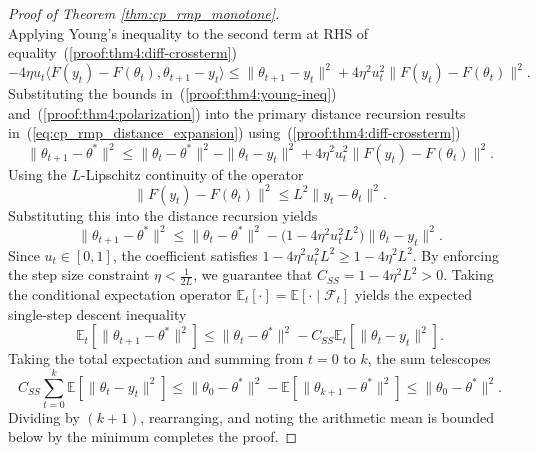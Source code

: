 \documentclass[letter,11pt]{article}
\begin{document}
\begin{proof}[Proof of Theorem \ref{thm:cp_rmp_monotone}]
\begin{equation}
\end{equation}
Applying Young's inequality to the second term at RHS of equality~(\ref{proof:thm4:diff-crossterm})
\begin{equation}\label{proof:thm4:young-ineq}
-4\eta u_t \langle F(y_t) - F(\theta_t), \theta_{t+1} - y_t \rangle \le \|\theta_{t+1} - y_t\|^2 + 4\eta^2 u_t^2 \|F(y_t) - F(\theta_t)\|^2.
\end{equation}
Substituting the bounds in~(\ref{proof:thm4:young-ineq}) and~(\ref{proof:thm4:polarization}) into the primary distance recursion results in~(\ref{eq:cp_rmp_distance_expansion}) using~(\ref{proof:thm4:diff-crossterm})
\begin{equation}
\|\theta_{t+1} - \theta^*\|^2 \le \|\theta_t - \theta^*\|^2 - \|\theta_t - y_t\|^2 + 4\eta^2 u_t^2 \|F(y_t) - F(\theta_t)\|^2.
\end{equation}
Using the $L$-Lipschitz continuity of the operator
\begin{equation}
\|F(y_t) - F(\theta_t)\|^2 \le L^2 \|y_t - \theta_t\|^2.
\end{equation}
Substituting this into the distance recursion yields
\begin{equation}\label{proof:thm4:distance-recursion}
\|\theta_{t+1} - \theta^*\|^2 \le \|\theta_t - \theta^*\|^2 - \big( 1 - 4\eta^2 u_t^2 L^2 \big) \|\theta_t - y_t\|^2.
\end{equation}
Since $u_t \in [0, 1]$, the coefficient satisfies $1 - 4\eta^2 u_t^2 L^2 \ge 1 - 4\eta^2 L^2$. By enforcing the step size constraint $\eta < \frac{1}{2L}$, we guarantee that $C_{SS} = 1 - 4\eta^2 L^2 > 0$. Taking the conditional expectation operator $\mathbb{E}_t[\cdot] = \mathbb{E}[\cdot \mid \mathcal{F}_t]$ yields the expected single-step descent inequality
\begin{equation}\label{proof:thm4:single-step-descent}
\mathbb{E}_t\left[\|\theta_{t+1} - \theta^*\|^2\right] \le \|\theta_t - \theta^*\|^2 - C_{SS} \mathbb{E}_t\left[\|\theta_t - y_t\|^2\right].
\end{equation}
Taking the total expectation and summing from $t = 0$ to $k$, the sum telescopes
\begin{equation}
C_{SS} \sum_{t=0}^k \mathbb{E}\left[\|\theta_t - y_t\|^2\right] \le \|\theta_0 - \theta^*\|^2 - \mathbb{E}\left[\|\theta_{k+1} - \theta^*\|^2\right] \le \|\theta_0 - \theta^*\|^2.
\end{equation}
Dividing by $(k+1)$, rearranging, and noting the arithmetic mean is bounded below by the minimum completes the proof.
\end{proof}
\end{document}
